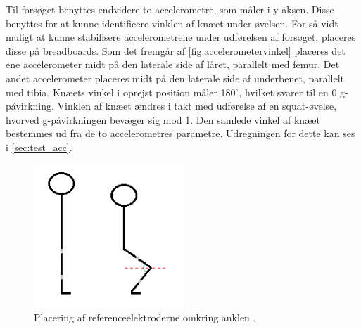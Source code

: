 Til forsøget benyttes endvidere to accelerometre, som måler i y-aksen. Disse benyttes for at kunne identificere vinklen af knæet under øvelsen. For så vidt muligt at kunne stabilisere accelerometrene under udførelsen af forsøget, placeres disse på breadboards. 
Som det fremgår af \autoref{fig:accelerometervinkel} placeres det ene accelerometer midt på den laterale side af låret, parallelt med femur. Det andet accelerometer placeres midt på den laterale side af underbenet, parallelt med tibia. Knæets vinkel i oprejst position måler 180$^{\circ}$, hvilket svarer til en 0 g-påvirkning. Vinklen af knæet ændres i takt med udførelse af en squat-øvelse, hvorved g-påvirkningen bevæger sig mod 1. Den samlede vinkel af knæet bestemmes ud fra de to accelerometres parametre. Udregningen for dette kan ses i \autoref{sec:test_acc}.

\begin{figure}[H]
\centering
\includegraphics[width=0.5\textwidth]{figures/accelerometervinkel.png}
\caption{Placering af referenceelektroderne omkring anklen \citep{ankle2016}.}
\label{fig:accelerometervinkel}
\end{figure}

